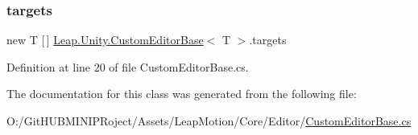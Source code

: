 \subsubsection{\texorpdfstring{targets}{targets}}
{\footnotesize\ttfamily new T \mbox{[}$\,$\mbox{]} \mbox{\hyperlink{class_leap_1_1_unity_1_1_custom_editor_base}{Leap.\+Unity.\+Custom\+Editor\+Base}}$<$ T $>$.targets\hspace{0.3cm}{\ttfamily [protected]}}



Definition at line 20 of file Custom\+Editor\+Base.\+cs.



The documentation for this class was generated from the following file\+:\begin{DoxyCompactItemize}
\item 
O\+:/\+Git\+H\+U\+B\+M\+I\+N\+I\+P\+Roject/\+Assets/\+Leap\+Motion/\+Core/\+Editor/\mbox{\hyperlink{_custom_editor_base_8cs}{Custom\+Editor\+Base.\+cs}}\end{DoxyCompactItemize}
